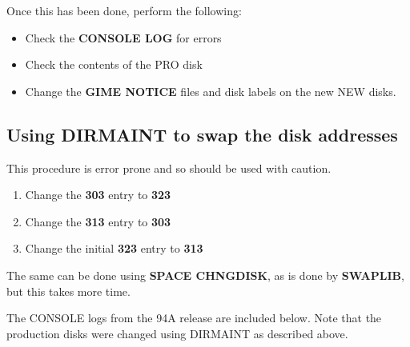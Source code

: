 Once this has been done, perform the following:

\begin{itemize}
\item
Check the {\bf CONSOLE LOG} for errors
\item
Check the contents of the PRO disk
\item
Change the {\bf GIME NOTICE} files and disk labels
on the new NEW disks.
\end{itemize}

\subsection{Using DIRMAINT to swap the disk addresses}

This procedure is error prone and so should be used with caution.

\begin{enumerate}
\item
Change the {\bf 303} entry to {\bf 323}
\item
Change the {\bf 313} entry to {\bf 303}
\item
Change the initial {\bf 323} entry to {\bf 313}
\end{enumerate}

The same can be done using {\bf SPACE CHNGDISK}, as is done
by {\bf SWAPLIB}, but this takes more time.

The CONSOLE logs from the 94A release are included below. Note
that the production disks were changed using DIRMAINT as 
described above.

